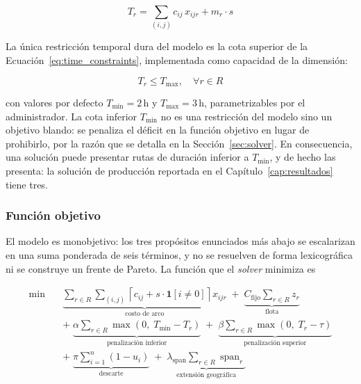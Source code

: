 \begin{equation}
  T_r = \sum_{(i,j)} c_{ij}\,x_{ijr} + m_r \cdot s
  \label{eq:route_time}
\end{equation}

La única restricción temporal dura del modelo es la cota superior de la
Ecuación~\ref{eq:time_constraints}, implementada como capacidad de la dimensión:

\begin{equation}
  T_r \leq T_{\max}, \quad \forall r \in R
  \label{eq:time_constraints}
\end{equation}

con valores por defecto $T_{\min} = 2\,\text{h}$ y $T_{\max} = 3\,\text{h}$,
parametrizables por el administrador. La cota inferior $T_{\min}$
no es una restricción del modelo sino un objetivo blando: se penaliza el
déficit en la función objetivo en lugar de prohibirlo, por la razón que se detalla
en la Sección~\ref{sec:solver}. En consecuencia, una solución puede presentar rutas
de duración inferior a $T_{\min}$, y de hecho las presenta: la solución de
producción reportada en el Capítulo~\ref{cap:resultados} tiene tres.

\subsubsection*{Función objetivo}

El modelo es monobjetivo: los tres propósitos enunciados más abajo se escalarizan
en una suma ponderada de seis términos, y no se resuelven de forma lexicográfica ni
se construye un frente de Pareto. La función que el \textit{solver} minimiza es

\begin{equation}
  \begin{aligned}
    \min \quad
      &\underbrace{\sum_{r \in R} \sum_{(i,j)} \left\lceil c_{ij} + s\cdot\mathbf{1}[i \neq 0] \right\rceil x_{ijr}}_{\text{costo de arco}}
      \;+\; \underbrace{C_{\text{fijo}} \sum_{r \in R} z_r}_{\text{flota}} \\[2pt]
      &+\; \underbrace{\alpha \sum_{r \in R} \max\!\left(0,\; T_{\min} - T_r\right)}_{\text{penalización inferior}}
      \;+\; \underbrace{\beta \sum_{r \in R} \max\!\left(0,\; T_r - \tau\right)}_{\text{penalización superior}} \\[2pt]
      &+\; \underbrace{\pi \sum_{i=1}^{n} \left(1 - u_i\right)}_{\text{descarte}}
      \;+\; \underbrace{\lambda_{\text{span}} \sum_{r \in R} \operatorname{span}_r}_{\text{extensión geográfica}}
  \end{aligned}
  \label{eq:objetivo}
\end{equation}

